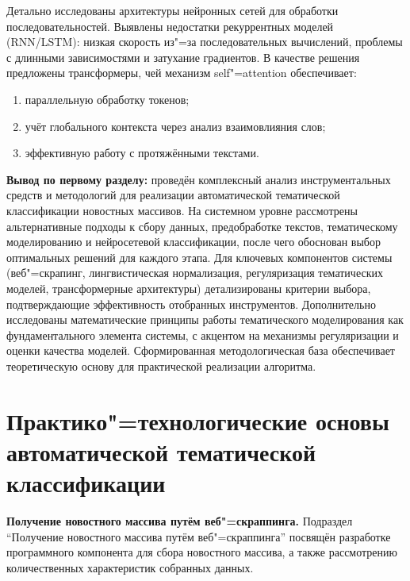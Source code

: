 \documentclass[autoref]{SCWorks}
\begin{document}
Детально исследованы архитектуры нейронных сетей для обработки
последовательностей. Выявлены недостатки рекуррентных моделей (RNN/LSTM):
низкая скорость из"=за последовательных вычислений, проблемы с длинными
зависимостями и затухание градиентов. В качестве решения предложены
трансформеры, чей механизм self"=attention обеспечивает:

\begin{enumerate}
    \item параллельную обработку токенов;
    \item учёт глобального контекста через анализ взаимовлияния слов;
    \item эффективную работу с протяжёнными текстами.
\end{enumerate}

\textbf{Вывод по первому разделу:} проведён комплексный анализ инструментальных
средств и методологий для реализации автоматической тематической классификации
новостных массивов. На системном уровне рассмотрены альтернативные подходы к
сбору данных, предобработке текстов, тематическому моделированию и нейросетевой
классификации, после чего обоснован выбор оптимальных решений для каждого этапа.
Для ключевых компонентов системы (веб"=скрапинг, лингвистическая нормализация,
регуляризация тематических моделей, трансформерные архитектуры) детализированы
критерии выбора, подтверждающие эффективность отобранных инструментов.
Дополнительно исследованы математические принципы работы тематического
моделирования как фундаментального элемента системы, с акцентом на механизмы
регуляризации и оценки качества моделей. Сформированная методологическая база
обеспечивает теоретическую основу для практической реализации алгоритма.

\section{Практико"=технологические основы автоматической тематической
классификации}

\textbf{Получение новостного массива путём веб"=скраппинга.}
Подраздел \enquote{Получение новостного массива путём веб"=скраппинга} посвящён
разработке программного компонента для сбора новостного массива, а также
рассмотрению количественных характеристик собранных данных.
\end{document}
